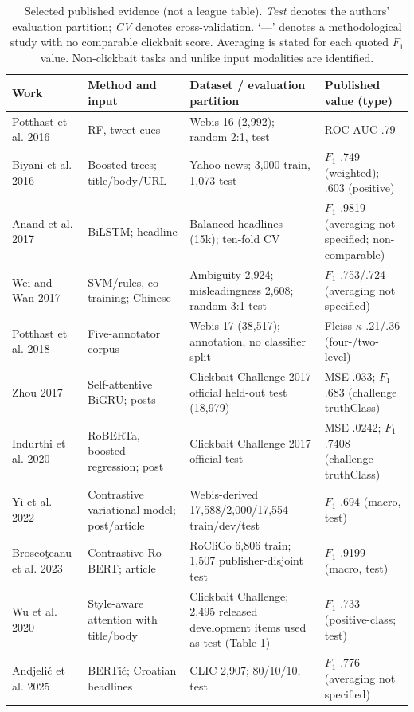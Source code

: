 \documentclass[11pt]{article}
\begin{document}
\begin{table}[t]
\centering
\caption{Selected published evidence (not a league table). \emph{Test} denotes the authors' evaluation partition; \emph{CV} denotes cross-validation. `---' denotes a methodological study with no comparable clickbait score. Averaging is stated for each quoted $F_1$ value. Non-clickbait tasks and unlike input modalities are identified.}
\label{tab:sota}
\setlength{\tabcolsep}{3pt}\renewcommand{\arraystretch}{1.04}\scriptsize
\begin{tabularx}{\textwidth}{@{}p{2.10cm}p{3.10cm}X p{2.25cm}@{}}
\toprule
Work & Method and input & Dataset / evaluation partition & Published value (type)\\
\midrule
Potthast et al. 2016 & RF, tweet cues & Webis-16 (2,992); random 2:1, test & ROC-AUC .79\\
Biyani et al. 2016 & Boosted trees; title/body/URL & Yahoo news; 3,000 train, 1,073 test & $F_1$ .749 (weighted); .603 (positive)\\
Anand et al. 2017 & BiLSTM; headline & Balanced headlines (15k); ten-fold CV & $F_1$ .9819 (averaging not specified; non-comparable)\\
Wei and Wan 2017 & SVM/rules, co-training; Chinese & Ambiguity 2,924; misleadingness 2,608; random 3:1 test & $F_1$ .753/.724 (averaging not specified)\\
Potthast et al. 2018 & Five-annotator corpus & Webis-17 (38,517); annotation, no classifier split & Fleiss $\kappa$ .21/.36 (four-/two-level)\\
Zhou 2017 & Self-attentive BiGRU; posts & Clickbait Challenge 2017 official held-out test (18,979) & MSE .033; $F_1$ .683 (challenge truthClass)\\
Indurthi et al. 2020 & RoBERTa, boosted regression; post & Clickbait Challenge 2017 official test & MSE .0242; $F_1$ .7408 (challenge truthClass)\\
Yi et al. 2022 & Contrastive variational model; post/article & Webis-derived 17,588/2,000/17,554 train/dev/test & $F_1$ .694 (macro, test)\\
Brosco\c{t}eanu et al. 2023 & Contrastive Ro-BERT; article & RoCliCo 6,806 train; 1,507 publisher-disjoint test & $F_1$ .9199 (macro, test)\\
Wu et al. 2020 & Style-aware attention with title/body & Clickbait Challenge; 2,495 released development items used as test (Table 1) & $F_1$ .733 (positive-class; test)\\
Andjeli\'c et al. 2025 & BERTi\'c; Croatian headlines & CLIC 2,907; 80/10/10, test & $F_1$ .776 (averaging not specified)\\

\end{tabularx}
\end{table}
\end{document}
